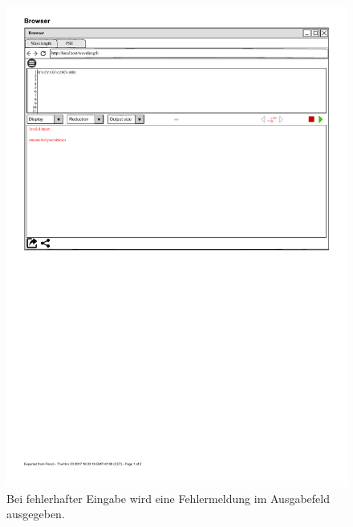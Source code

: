 \documentclass[parskip=full,11pt,twoside]{scrartcl}
\begin{document}
{\begin{figure}[H]
	\centering
	\includegraphics[width=\textwidth]{img/fehlerausgabe}
	\caption{Bei fehlerhafter Eingabe wird eine Fehlermeldung im Ausgabefeld ausgegeben.
}
\end{figure}



}
\end{document}
